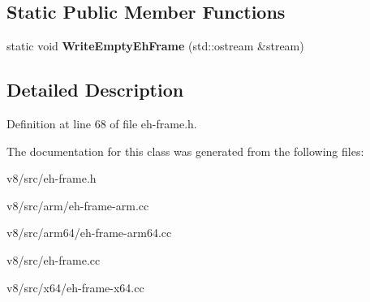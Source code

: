 \subsection*{Static Public Member Functions}
\begin{DoxyCompactItemize}
\item 
\mbox{\label{classv8_1_1internal_1_1EhFrameWriter_abd73b8532b49a572f205d82f4fb9735e}} 
static void {\bfseries Write\+Empty\+Eh\+Frame} (std\+::ostream \&stream)
\end{DoxyCompactItemize}


\subsection{Detailed Description}


Definition at line 68 of file eh-\/frame.\+h.



The documentation for this class was generated from the following files\+:\begin{DoxyCompactItemize}
\item 
v8/src/eh-\/frame.\+h\item 
v8/src/arm/eh-\/frame-\/arm.\+cc\item 
v8/src/arm64/eh-\/frame-\/arm64.\+cc\item 
v8/src/eh-\/frame.\+cc\item 
v8/src/x64/eh-\/frame-\/x64.\+cc\end{DoxyCompactItemize}

